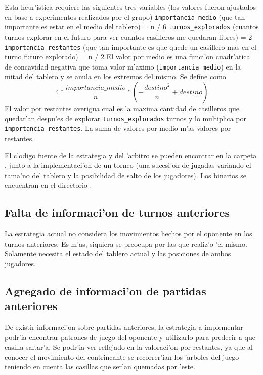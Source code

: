 \begin{algorithmic}[1]
\STATE Esta heur'istica requiere las siguientes tres variables (los valores fueron ajustados en base a experimentos realizados por el grupo)
	\STATE \verb|importancia_medio| (que tan importante es estar en el medio del tablero) = n / 6
	\STATE \verb|turnos_explorados| (cuantos turnos explorar en el futuro para ver cuantos casilleros me quedaran libres) = 2
	\STATE \verb|importancia_restantes| (que tan importante es que quede un casillero mas en el turno futuro explorado) = n / 2
\STATE El valor por medio es una funci'on cuadr'atica de concavidad negativa que toma valor m'aximo (\verb|importancia_medio|) en la mitad del tablero y se anula en los extremos del mismo. Se define como
	$$4 * \frac{importancia\_medio}{n} * \left(-\frac{destino^2}{n} + destino\right)$$
\STATE El valor por restantes averigua cual es la maxima cantidad de casilleros que quedar'an despu'es de explorar \verb|turnos_explorados| turnos y lo multiplica por \verb|importancia_restantes|.
\RETURN La suma de valores por medio m'as valores por restantes.
\end{algorithmic}

\vspace{1em}

El c'odigo fuente de la estrategia y  del 'arbitro se pueden encontrar en la carpeta , junto a la implementaci'on de un torneo (una sucesi'on de jugadas variando el tama'no del tablero y la posibilidad de salto de los jugadores). Los binarios se encuentran en el directorio .




\subsection{Falta de informaci'on de turnos anteriores}
La estrategia actual no considera los movimientos hechos por el oponente en los turnos anteriores. Es m'as, siquiera se preocupa por las que realiz'o 'el mismo. Solamente necesita el estado del tablero actual y las posiciones de ambos jugadores.




\subsection{Agregado de informaci'on de partidas anteriores}
De existir informaci'on sobre partidas anteriores, la estrategia a implementar podr'ia encontrar patrones de juego del oponente y utilizarlo para predecir a que casilla saltar'a. Se podr'ia ver reflejado en la valoraci'on por restantes, ya que al conocer el movimiento del contrincante se recorrer'ian los 'arboles del juego teniendo en cuenta las casillas que ser'an quemadas por 'este.



